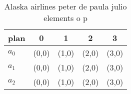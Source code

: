 \documentclass[a4paper]{article}
\begin{document}
\begin{table}
\begin{adjustbox}{width=0.6\columnwidth}
\begin{tabular}{|l|l|l|l|l|}
\hline
\textbf{plan} & \multicolumn{1}{c|}{\textbf{0}} & \multicolumn{1}{c|}{\textbf{1}} & \multicolumn{1}{c|}{\textbf{2}} & \multicolumn{1}{c|}{\textbf{3}} \\ \hline
\textbf{$a_0$}  & (0,0) & (1,0) & (2,0) & (3,0) \\ \hline
\textbf{$a_1$}  & (0,0) & (1,0) & (2,0) & (3,0) \\ \hline
\textbf{$a_2$}  & (0,0) & (1,0) & (2,0) & (3,0) \\ \hline
\end{tabular}
\end{adjustbox}
\caption{Alaska airlines peter de paula julio elements o p
}
\end{table}
\end{document}

